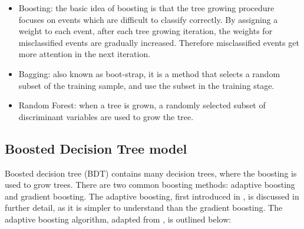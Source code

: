 \begin{itemize}
  \item Boosting: the basic idea of boosting is that the tree growing procedure focuses on events which are difficult to classify correctly. By assigning a weight to each event,   after each tree growing iteration, the weights for misclassified events are gradually increased. Therefore misclassified events get more attention in the next iteration.
  \item Bagging: also known as boot-strap, it is a method that selects a  random subset of the training sample, and use the subset in the training stage.
  \item Random Forest: when a tree is grown, a randomly selected subset of discriminant variables are used to grow the tree. %
\end{itemize}









\subsection{Boosted Decision Tree model}
\label{sec:analysisBDT}

Boosted decision tree (BDT) contains many decision trees, where the boosting is used to grow trees. There are two common boosting methods: adaptive boosting and gradient boosting. The adaptive boosting,  first introduced in \cite{FREUND1997119}, is discussed in further detail, as it is simpler to understand than the gradient boosting. The adaptive boosting algorithm, adapted from \cite{hastie2009elements},  is outlined below:

